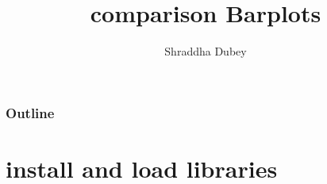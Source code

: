\documentclass{beamer}\usepackage[]{graphicx}\usepackage[]{color}
\begin{document}
\title{comparison Barplots}

\author{Shraddha Dubey}

\begin{frame}

  \titlepage

\end{frame}

\begin{frame}

  \frametitle{Outline}
    \tableofcontents

\end{frame}

\section{install and load libraries}
\end{document}

